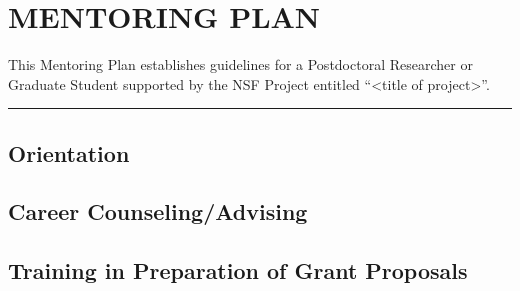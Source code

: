\documentclass[../preamble.tex]{subfiles}
\begin{document}
\section{MENTORING PLAN}




This Mentoring Plan establishes guidelines for a Postdoctoral Researcher or Graduate Student supported by the NSF Project entitled ``<title of project>''. 
\vpn\rule{\textwidth}{0.4pt}
\subsection{Orientation} %
\subsection{Career Counseling/Advising} %
\subsection{Training in Preparation of Grant Proposals} %
\end{document}

